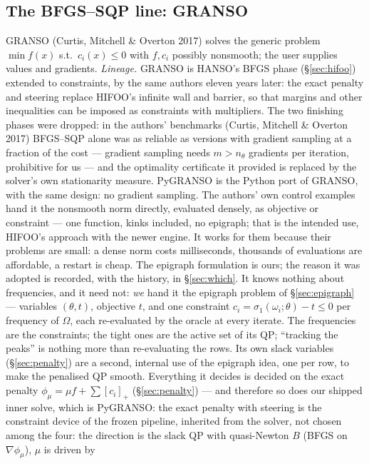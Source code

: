 \documentclass[11pt,a4paper]{article}
\newcommand{\rev}[1]{#1}
\newcommand{\revc}[1]{#1}
\newcommand{\revd}[1]{#1}
\begin{document}
\subsection{The BFGS--SQP line: \textsf{GRANSO}}
\label{sec:granso}
GRANSO (Curtis, Mitchell \& Overton 2017) solves the generic problem $\min f(x)$ s.t.\
$c_i(x)\le0$ with $f,c_i$ possibly nonsmooth; the user supplies values and gradients.
\revd{\emph{Lineage.}  GRANSO is HANSO's BFGS phase (\S\ref{sec:hifoo}) extended to
constraints, by the same authors eleven years later: the exact penalty and steering
replace HIFOO's infinite wall and barrier, so that margins and other inequalities can be
imposed as constraints with multipliers.  The two finishing phases were dropped: in the
authors' benchmarks (Curtis, Mitchell \& Overton 2017) BFGS--SQP alone was as reliable
as versions with gradient sampling at a fraction of the cost --- gradient sampling needs
$m>n_\theta$ gradients per iteration, prohibitive for us --- and the optimality
certificate it provided is replaced by the solver's own stationarity measure.
PyGRANSO is the Python port of GRANSO, with the same design: no gradient sampling.  The
authors' own control examples hand it the nonsmooth norm directly, evaluated densely, as
objective or constraint --- one function, kinks included, no epigraph; that is the
intended use, HIFOO's approach with the newer engine.  It works for them because their
problems are small: a dense norm costs milliseconds, thousands of evaluations are
affordable, a restart is cheap.  The epigraph formulation is ours; the reason it was
adopted is recorded, with the history, in \S\ref{sec:which}.}  \rev{It knows nothing
about frequencies, and it need not: \emph{we} hand it the epigraph problem of
\S\ref{sec:epigraph} --- variables $(\theta,t)$, objective $t$, and
one constraint $c_i=\sigma_1(\omega_i;\theta)-t\le0$ per frequency of $\Omega$, each
re-evaluated by the oracle at every iterate.  The frequencies are the constraints; the
tight ones are the active set of its QP; ``tracking the peaks'' is nothing more than
re-evaluating the rows.  Its own slack variables (\S\ref{sec:penalty}) are a second,
internal use of the epigraph idea, one per row, to make the penalised QP smooth.}  Everything it decides is decided on the exact penalty $\phi_\mu=\mu f+\sum[c_i]_+$
(\S\ref{sec:penalty}) \revc{--- and therefore so does our shipped inner solve, which is
PyGRANSO: the exact penalty with steering is the constraint device of the frozen
pipeline, inherited from the solver, not chosen among the four}: the direction is
the slack QP with quasi-Newton $B$ (BFGS on $\nabla\phi_\mu$), $\mu$ is driven by
\end{document}
